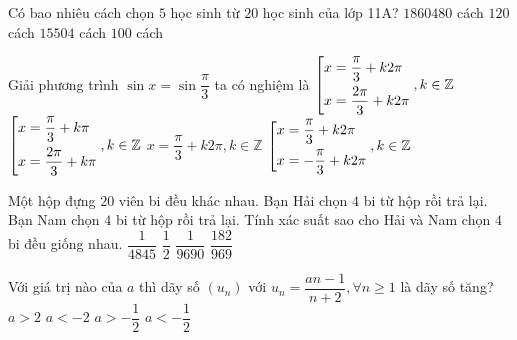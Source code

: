 \begin{ex}%
	Có bao nhiêu cách chọn $ 5 $ học sinh từ $ 20 $ học sinh của lớp 11A? 
	\choice
	{$ 1860480 $ cách}
	{$ 120 $ cách}
	{\True $ 15504 $ cách}
	{$ 100 $ cách}
\end{ex}
\begin{ex}%
	Giải phương trình $ \sin x=\sin\dfrac{\pi}{3} $ ta có nghiệm là
	\choice
	{\True $ \left[\begin{aligned}&x=\dfrac{\pi}{3}+k2\pi\\&x=\dfrac{2\pi}{3}+k2\pi\end{aligned}\right., k\in\mathbb{Z} $}
	{$ \left[\begin{aligned}&x=\dfrac{\pi}{3}+k\pi\\&x=\dfrac{2\pi}{3}+k\pi\end{aligned}\right., k\in\mathbb{Z} $}
	{$ x=\dfrac{\pi}{3}+k2\pi, k\in\mathbb{Z} $}
	{$ \left[\begin{aligned}&x=\dfrac{\pi}{3}+k2\pi\\&x=-\dfrac{\pi}{3}+k2\pi\end{aligned}\right., k\in\mathbb{Z} $}
\end{ex}
\begin{ex}%
	
	Một hộp đựng $ 20 $ viên bi đều khác nhau. Bạn Hải chọn $ 4 $ bi từ hộp rồi trả lại. Bạn Nam chọn $ 4 $ bi từ hộp rồi trả lại. Tính xác suất sao cho Hải và Nam chọn $ 4 $ bi đều giống nhau. 
	\choice
	{\True $ \dfrac{1}{4845} $}
	{$ \dfrac{1}{2} $}
	{$ \dfrac{1}{9690} $}
	{$ \dfrac{182}{969} $}
\end{ex}
\begin{ex}%
	Với giá trị nào của $ a $ thì dãy số $ \left(u_n\right) $ với $ u_n=\dfrac{an-1}{n+2}, \forall n \ge 1 $ là dãy số tăng?
	\choice
	{$ a>2 $}
	{$ a<-2 $}
	{\True $ a>-\dfrac{1}{2} $}
	{$ a<-\dfrac{1}{2} $}
\end{ex}

